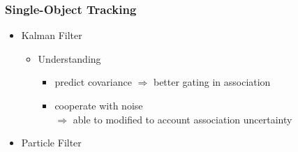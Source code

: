 \subsubsection{Single-Object Tracking}
\begin{itemize}
\item Kalman Filter
	\begin{itemize}
	\item Understanding
		\begin{itemize}
		\item predict covariance $\Rightarrow$ better gating in association
		\item cooperate with noise \\
		$\Rightarrow$ able to modified to account association uncertainty
		\end{itemize}
	\end{itemize}

\item Particle Filter


\end{itemize}
